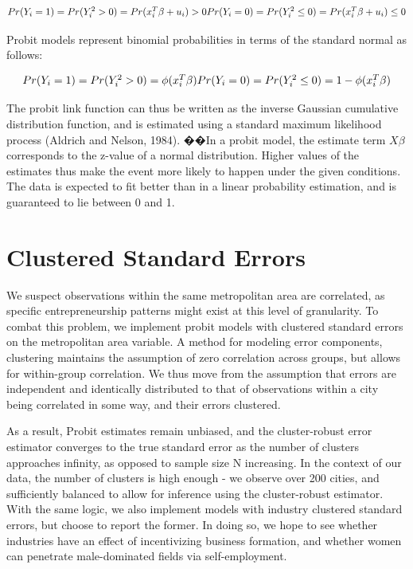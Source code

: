 \begin{dmath}
\mbox{$Pr(Y_i = 1) = Pr(Y^2_i > 0) = Pr (x^T_i\beta + u_i) >0 $} \\
\mbox{$Pr(Y_i = 0) = Pr(Y^2_i \leq 0) = Pr (x^T_i\beta + u_i) \leq 0 $}
\end{dmath}

Probit models represent binomial probabilities in terms of the standard normal as follows:

\begin{dmath}
\mbox{$Pr(Y_i = 1) = Pr(Y^2_i > 0) = \phi(x^T_i\beta) $} \\
\mbox{$Pr(Y_i = 0) = Pr(Y^2_i \leq 0) = 1 - \phi(x^T_i\beta) $}
\end{dmath}

The probit link function can thus be written as the inverse Gaussian cumulative distribution function, and is estimated using a standard maximum likelihood process (Aldrich and Nelson, 1984). ��In a probit model, the estimate term $X\beta$ corresponds to the z-value of a normal distribution. Higher values of the estimates thus make the event more likely to happen under the given conditions. The data is expected to fit better than in a linear probability estimation, and is guaranteed to lie between 0 and 1. 

\section{Clustered Standard Errors}

We suspect observations within the same metropolitan area are correlated, as specific entrepreneurship patterns might exist at this level of granularity. To combat this problem, we implement probit models with clustered standard errors on the metropolitan area variable. A method for modeling error components, clustering maintains the assumption of zero correlation across groups, but allows for within-group correlation. We thus move from the assumption that errors are independent and identically distributed to that of observations within a city being correlated in some way, and their errors clustered.

As a result, Probit estimates remain unbiased, and the cluster-robust error estimator converges to the true standard error as the number of clusters approaches infinity, as opposed to sample size N increasing. In the context of our data, the number of clusters is high enough - we observe over 200 cities, and sufficiently balanced to allow for inference using the cluster-robust estimator. With the same logic, we also implement models with industry clustered standard errors, but choose to report the former. In doing so, we hope to see whether industries have an effect of incentivizing business formation, and whether women can penetrate male-dominated fields via self-employment. 

